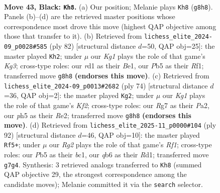 \documentclass[11pt]{article}
\begin{document}
\clearpage

\begin{figure}[p]\centering
\begin{subfigure}{0.46\textwidth}\centering
\resizebox{\linewidth}{!}{%
\newchessgame
\chessboard[
  setfen={6k1/5rrp/1Q6/Np5P/6P1/8/PP3P1K/3R4 b - - 4 43},
  showmover=false,
  pgfstyle=straightmove, color=movearrow, markmove={g8-h8}
]}
\caption{}
\end{subfigure}\hfill
\begin{subfigure}{0.46\textwidth}\centering
\resizebox{\linewidth}{!}{%
\newchessgame
\chessboard[
  setfen={8/1pp3pk/5p2/1q5p/7P/P4RK1/6P1/4BR2 w - - 0 42},
  showmover=false,
  pgfstyle=straightmove, color=movearrow, markmove={g3-h2}
]}
\caption{}
\end{subfigure}
\\[4pt]
\begin{subfigure}{0.46\textwidth}\centering
\resizebox{\linewidth}{!}{%
\newchessgame
\chessboard[
  setfen={7k/1p5p/4p3/p2p4/3P1q2/2P5/PP2RK2/4R3 w - - 6 38},
  showmover=false,
  pgfstyle=straightmove, color=movearrow, markmove={f2-g2}
]}
\caption{}
\end{subfigure}\hfill
\begin{subfigure}{0.46\textwidth}\centering
\resizebox{\linewidth}{!}{%
\newchessgame
\chessboard[
  setfen={8/6p1/7p/p1k5/n2p4/6P1/3p3P/2bR1RK1 w - - 2 47},
  showmover=false,
  pgfstyle=straightmove, color=movearrow, markmove={f1-f5}
]}
\caption{}
\end{subfigure}
\caption{\textbf{Move 43, Black: \texttt{Kh8}.} (a) Our position; Melanie plays \texttt{Kh8} (\texttt{g8h8}). Panels (b)--(d) are the retrieved master positions whose correspondence most drove this move (highest QAP objective among those that transfer to it). (b) Retrieved from \texttt{lichess\_elite\_2024-09\_p0028\#585} (ply 82) [structural distance $d$=50, QAP obj=25]: the master played \texttt{Kh2}; under $\mu$ our \emph{Kg1} plays the role of that game's \emph{Kg3}; cross-type roles: our \emph{r}d1 as their \emph{B}e1, our \emph{P}b5 as their \emph{R}f1; transferred move \texttt{g8h8} \textbf{(endorses this move)}. (c) Retrieved from \texttt{lichess\_elite\_2024-09\_p0013\#2682} (ply 74) [structural distance $d$=36, QAP obj=2]: the master played \texttt{Kg2}; under $\mu$ our \emph{Kg1} plays the role of that game's \emph{Kf2}; cross-type roles: our \emph{R}g7 as their \emph{P}a2, our \emph{p}h5 as their \emph{R}e2; transferred move \texttt{g8h8} \textbf{(endorses this move)}. (d) Retrieved from \texttt{lichess\_elite\_2025-11\_p0000\#104} (ply 92) [structural distance $d$=46, QAP obj=10]: the master played \texttt{Rf5+}; under $\mu$ our \emph{Rg2} plays the role of that game's \emph{Rf1}; cross-type roles: our \emph{P}b5 as their \emph{b}c1, our \emph{q}b6 as their \emph{R}d1; transferred move \texttt{g7g4}. Synthesis: 3 retrieved analogs transferred to \texttt{Kh8} (summed QAP objective 29, the strongest correspondence among the candidate moves); Melanie committed it via the \texttt{search} selector.}
\label{fig:thought-m85}
\end{figure}
\end{document}
